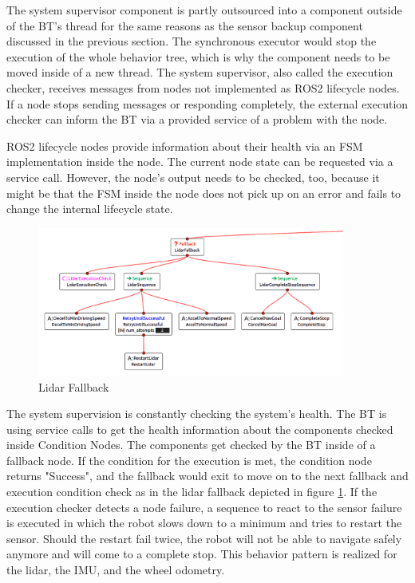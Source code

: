 The system supervisor component is partly outsourced into a component outside of the BT's thread for the same reasons as the sensor backup component discussed in the previous section. The synchronous executor would stop the execution of the whole behavior tree, which is why the component needs to be moved inside of a new thread. The system supervisor, also called the execution checker, receives messages from nodes not implemented as ROS2 lifecycle nodes. If a node stops sending messages or responding completely, the external execution checker can inform the BT via a provided service of a problem with the node. 

ROS2 lifecycle nodes provide information about their health via an FSM implementation inside the node. The current node state can be requested via a service call. However, the node's output needs to be checked, too, because it might be that the FSM inside the node does not pick up on an error and fails to change the internal lifecycle state. 

\begin{figure}[ht]
	\centering
	\includegraphics[width=0.9\textwidth]{images/sensor_fallback_inverted.png}
	\caption{Lidar Fallback}
	\label{fig:lidar_fallback}
\end{figure}

The system supervision is constantly checking the system's health. The BT is using service calls to get the health information about the components checked inside Condition Nodes. The components get checked by the BT inside of a fallback node. If the condition for the execution is met, the condition node returns "Success", and the fallback would exit to move on to the next fallback and execution condition check as in the lidar fallback depicted in figure  \ref{fig:lidar_fallback}. If the execution checker detects a node failure, a sequence to react to the sensor failure is executed in which the robot slows down to a minimum and tries to restart the sensor. Should the restart fail twice, the robot will not be able to navigate safely anymore and will come to a complete stop. This behavior pattern is realized for the lidar, the IMU, and the wheel odometry. 

